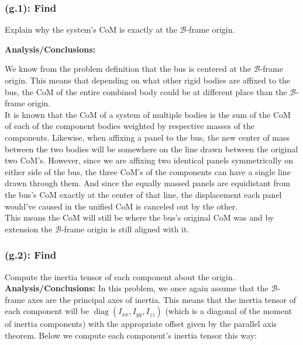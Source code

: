 \documentclass[titlepage]{article}
\newcommand{\diag}{\operatorname{diag}}
\begin{document}
\subsubsection*{(g.1): Find}
Explain why the system's CoM is exactly at the $\mathcal{B}$-frame origin.

\textbf{Analysis/Conclusions:}
\begin{mdframed}[linewidth=1pt, innertopmargin=10pt, innerbottommargin=10pt]
	We know from the problem definition that the bus is centered at the $\mathcal{B}$-frame origin. This means that depending on what other rigid bodies are affixed to the bus, the CoM of the entire combined body could be at different place than the $\mathcal{B}$-frame origin.\\
	
	It is known that the CoM of a system of multiple bodies is the sum of the CoM of each of the component bodies weighted by respective masses of the components. Likewise, when affixing a panel to the bus, the new center of mass between the two bodies will be somewhere on the line drawn between the original two CoM's. However, since we are affixing two identical panels symmetrically on either side of the bus, the three CoM's of the components can have a single line drawn through them. And since the equally massed panels are equidistant from the bus's CoM exactly at the center of that line, the displacement each panel would've caused in the unified CoM is canceled out by the other.\\
	
	This means the CoM will still be where the bus's original CoM was and by extension the $\mathcal{B}$-frame origin is still aligned with it.
\end{mdframed}

\subsubsection*{(g.2): Find}
Compute the inertia tensor of each component about the origin. \\

\textbf{Analysis/Conclusions:}
In this problem, we once again assume that the $\mathcal{B}$-frame axes are the principal axes of inertia. This means that the inertia tensor of each component will be $\diag(I_{xx}, I_{yy}, I_{zz})$ (which is a diagonal of the moment of inertia components) with the appropriate offset given by the parallel axis theorem. Below we compute each component's inertia tensor this way:\\
\end{document}
